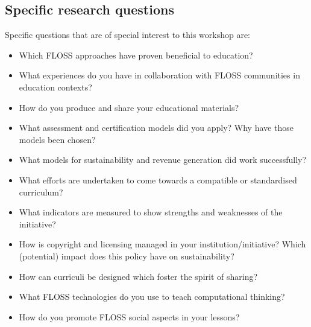 \documentclass[ifip]{svmult}
\begin{document}
\subsection*{Specific research questions}
Specific questions that are of special interest to this workshop are: 
\begin{itemize}
 \item Which FLOSS approaches have proven beneficial to education?
 \item What experiences do you have in collaboration with FLOSS communities in education contexts?
 \item How do you produce and share your educational materials? 
 \item What assessment and certification models did you apply? Why have those models been chosen? 
 \item What models for sustainability and revenue generation did work successfully? 
 \item What efforts are undertaken to come towards a compatible or standardised curriculum? 
 \item What indicators are measured to show strengths and weaknesses of the initiative? 
 \item How is copyright and licensing managed in your institution/initiative? Which (potential) impact does this policy have on sustainability? 
 \item How can curriculi be designed which foster the spirit of sharing? 
 \item What FLOSS technologies do you use to teach computational thinking?
 \item How do you promote FLOSS social aspects in your lessons?
\end{itemize}
%
%
% 
% 
%
%


\printindex
\end{document}
